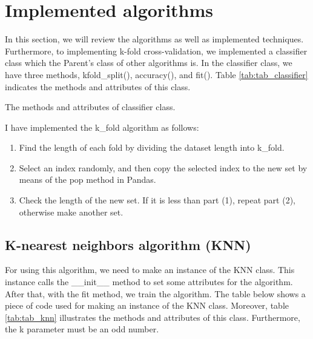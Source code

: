 \vspace{2cm}
\section{ Implemented algorithms}
\vspace{2cm}

In this section, we will review the algorithms as well as implemented techniques. Furthermore, to implementing k-fold cross-validation, we implemented a classifier class which the Parent’s class of other algorithms is.
In the classifier class, we have three methods, kfold\_split(), accuracy(), and fit(). Table \ref{tab:tab_classifier} indicates the methods and attributes of this class. 


\begin{table}[H]
\centering
\caption{The methods and attributes of classifier class.}
\label{tab:tab_classifier}

\end{table}

I have implemented the k\_fold algorithm as follows:
\begin{enumerate}
    \item Find the length of each fold by dividing the dataset length into k\_fold.
    \item Select an index randomly, and then copy the selected index to the new set by means of the pop method in Pandas.
    \item Check the length of the new set. If it is less than part (1), repeat part (2), otherwise make another set.
\end{enumerate}











\subsection{K-nearest neighbors algorithm (KNN)}

For using this algorithm, we need to make an instance of the KNN class. This instance calls the \_\_init\_\_ method to set some attributes for the algorithm. After that, with the fit method, we train the algorithm. The table below shows a piece of code used for making an instance of the KNN class. Moreover, table \ref{tab:tab_knn} illustrates the methods and attributes of this class. Furthermore, the k parameter must be an odd number. 


